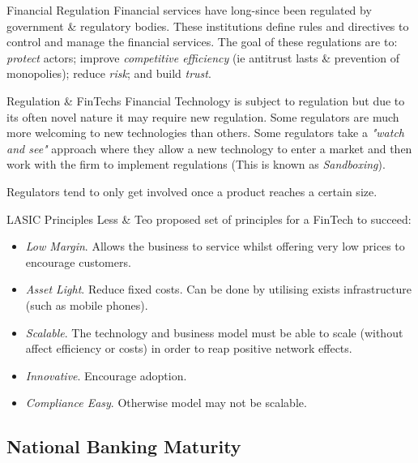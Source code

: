 \documentclass[11pt,a4paper]{article}
\begin{document}
\begin{definition}{Financial Regulation}
  Financial services have long-since been regulated by government \& regulatory bodies. These institutions define rules and directives to control and manage the financial services. The goal of these regulations are to: \textit{protect} actors; improve \textit{competitive efficiency} (ie antitrust lasts \& prevention of monopolies); reduce \textit{risk}; and build \textit{trust}.
\end{definition}

\begin{remark}{Regulation \& FinTechs}
  Financial Technology is subject to regulation but due to its often novel nature it may require new regulation. Some regulators are much more welcoming to new technologies than others. Some regulators take a \textit{"watch and see"} approach where they allow a new technology to enter a market and then work with the firm to implement regulations (This is known as \textit{Sandboxing}).
  \par Regulators tend to only get involved once a product reaches a certain size.
\end{remark}

\begin{proposition}{LASIC Principles}
  Less \& Teo proposed set of principles for a FinTech to succeed:
  \begin{itemize}
    \item \textit{Low Margin}. Allows the business to service whilst offering very low prices to encourage customers.
    \item \textit{Asset Light}. Reduce fixed costs. Can be done by utilising exists infrastructure (such as mobile phones).
    \item \textit{Scalable}. The technology and business model must be able to scale (without affect efficiency or costs) in order to reap positive network effects.
    \item \textit{Innovative}. Encourage adoption.
    \item \textit{Compliance Easy}. Otherwise model may not be scalable.
  \end{itemize}
\end{proposition}

\subsection{National Banking Maturity}
\end{document}

